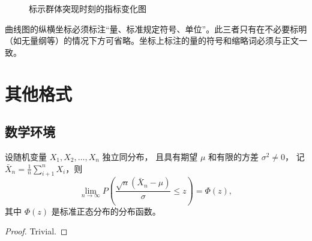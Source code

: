 \documentclass{cqupt_thesis}
\begin{document}
    \begin{figure}[H]
        \centering


        \centering
        \caption{ 标示群体突现时刻的指标变化图\cite{陈浩元2015gb} }
    \end{figure}
    曲线图的纵横坐标必须标注“量、标准规定符号、单位”。此三者只有在不必要标明（如无量纲等）的情况下方可省略。坐标上标注的量的符号和缩略词必须与正文一致。

	\chapter{其他格式}
    \section{数学环境}
    \begin{theorem}
        设随机变量 $X_1, X_2, \dots, X_n$ 独立同分布， 且具有期望 $\mu$ 和有限的方差 $\sigma^2 \ne 0$，
        记 $\bar{X}_n = \frac{1}{n} \sum_{i+1}^n X_i$，则
        \begin{equation}
            \lim_{n \to \infty} P \left(\frac{\sqrt{n} \left( \bar{X}_n - \mu \right)}{\sigma} \le z \right) = \Phi(z),
        \end{equation}
        其中 $\Phi(z)$ 是标准正态分布的分布函数。
    \end{theorem}
    \begin{proof}
        Trivial.
    \end{proof}
\end{document}
